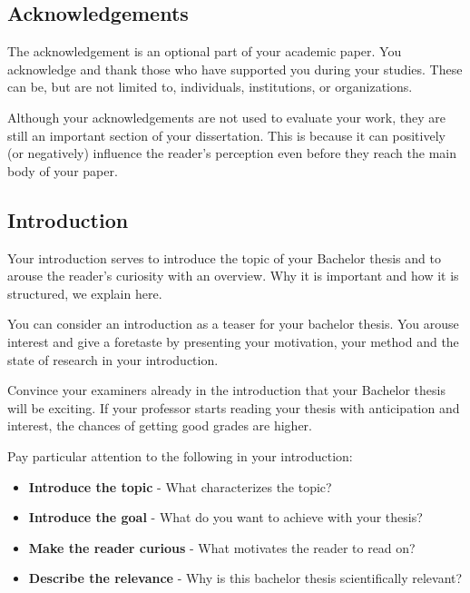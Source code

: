 \documentclass[a4paper,11pt,fleqn]{book}
\begin{document}
\subsection{Acknowledgements}
The acknowledgement is an optional part of your academic paper. You acknowledge and thank those who have supported you during your studies. These can be, but are not limited to, individuals, institutions, or organizations.

Although your acknowledgements are not used to evaluate your work, they are still an important section of your dissertation. This is because it can positively (or negatively) influence the reader's perception even before they reach the main body of your paper.

\subsection{Introduction}
Your introduction serves to introduce the topic of your Bachelor thesis and to arouse the reader's curiosity with an overview. Why it is important and how it is structured, we explain here.

You can consider an introduction as a teaser for your bachelor thesis. You arouse interest and give a foretaste by presenting your motivation, your method and the state of research in your introduction.

Convince your examiners already in the introduction that your Bachelor thesis will be exciting. If your professor starts reading your thesis with anticipation and interest, the chances of getting good grades are higher.

Pay particular attention to the following in your introduction:

\begin{itemize}
  \item \textbf{Introduce the topic} - What characterizes the topic?
  \item \textbf{Introduce the goal} - What do you want to achieve with your thesis?
  \item \textbf{Make the reader curious} - What motivates the reader to read on?
  \item \textbf{Describe the relevance} - Why is this bachelor thesis scientifically relevant?
\end{itemize}
\end{document}
